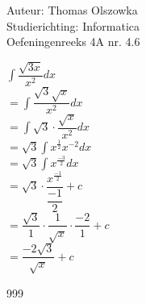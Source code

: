 \documentclass[a4paper]{article}
\newcommand{\dint}{\displaystyle\int}
\begin{document}
\noindent \large Auteur: Thomas Olszowka \\
\noindent \large Studierichting: Informatica \\
\noindent \large Oefeningenreeks 4A nr. 4.6  \\



\medskip

\normalsize

$\dint \dfrac{\sqrt{3x}}{x^2} dx$ \\

$= \dint \dfrac{\sqrt{3} \sqrt{x}}{x^2} dx$ \\

$= \dint \sqrt{3} \cdot \dfrac{\sqrt{x}}{x^2} dx$ \\

$= \sqrt{3} \dint x^{\tfrac{1}{2}} x^{-2} dx$ \\

$= \sqrt{3} \dint x^{\tfrac{-3}{2}} dx$ \\

$= \sqrt{3} \cdot \dfrac{x^{\tfrac{-1}{2}}}{\dfrac{-1}{2}} + c$ \\

$= \dfrac{\sqrt{3}}{1} \cdot \dfrac{1}{\sqrt{x}} \cdot \dfrac{-2}{1} + c$ \\

$= \dfrac{-2\sqrt{3}}{\sqrt{x}} + c$ \\ 

\begin{thebibliography}{999}
\end{thebibliography}
\end{document}
